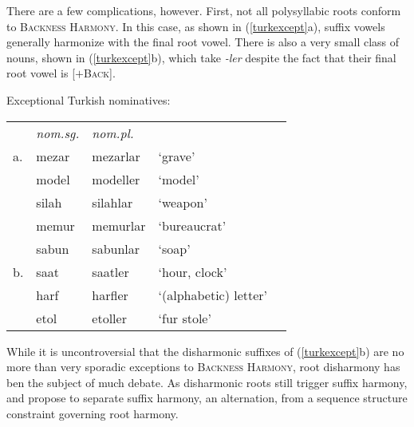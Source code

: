 There are a few complications, however. First, not all polysyllabic roots conform to \textsc{Backness Harmony}. In this case, as shown in (\ref{turkexcept}a), suffix vowels generally harmonize with the final root vowel. There is also a very small class of nouns, shown in (\ref{turkexcept}b), which take \emph{-ler} despite the fact that their final root vowel is [$+$\textsc{Back}].

\begin{example}
\label{turkexcept}
Exceptional Turkish nominatives:

\begin{tabular}{l l l l l}
   & \emph{nom.sg.} & \emph{nom.pl.} \\
a. & mezar          & mezarlar       & `grave' & \citep{TELL} \\
   & model          & modeller       & `model' \\
   & silah          & silahlar       & `weapon'     \\
   & memur          & memurlar       & `bureaucrat' \\
   & sabun          & sabunlar       & `soap'       \\
b. & saat           & saatler        & `hour, clock' \\
   & harf           & harfler        & `(alphabetic) letter' \\ %
   & etol           & etoller        & `fur stole' \\
\end{tabular}
\end{example}

While it is uncontroversial that the disharmonic suffixes of (\ref{turkexcept}b) are no more than very sporadic exceptions to \textsc{Backness Harmony}, root disharmony has ben the subject of much debate. As disharmonic roots still trigger suffix harmony, \citet[][212, 289]{Anderson1974} and \citet{Iverson1978} propose to separate suffix harmony, an alternation, from a sequence structure constraint governing root harmony. 

